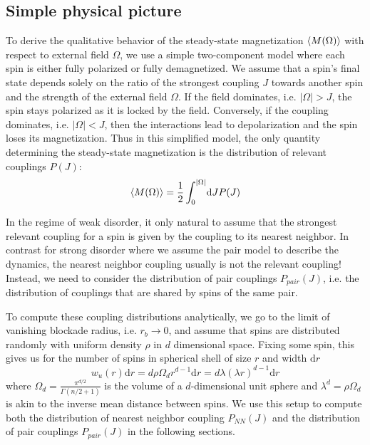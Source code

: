 \subsection{Simple physical picture}\label{sec:cusp-round-sharp}
To derive the qualitative behavior of the steady-state magnetization $\braket{M(\Omega)}$ with respect to external field $\Omega$, we use a simple two-component model where each spin is either fully polarized or fully demagnetized. We assume that a spin's final state depends solely on the ratio of the strongest coupling $J$ towards another spin and the strength of the external field $\Omega$. If the field dominates, i.e. $|\Omega| > J$, the spin stays polarized as it is locked by the field. Conversely, if the coupling dominates, i.e. $|\Omega| < J$, then the interactions lead to depolarization and the spin loses its magnetization. Thus in this simplified model, the only quantity determining the steady-state magnetization is the distribution of relevant couplings $P(J)$:
\begin{equation}\label{eq:Cusp-simple-model-magnetization}
	\braket{M(\Omega)} = \frac{1}{2}\int_0^{|\Omega|}\!\mathrm{d}J P(J)
\end{equation}

In the regime of weak disorder, it only natural to assume that the strongest relevant coupling for a spin is given by the coupling to its nearest neighbor. In contrast for strong disorder where we assume the pair model to describe the dynamics, the nearest neighbor coupling usually is not the relevant coupling! Instead, we need to consider the distribution of pair couplings $P_{pair}(J)$, i.e. the distribution of couplings that are shared by spins of the same pair.

To compute these coupling distributions analytically, we go to the limit of vanishing blockade radius, i.e. $r_b\rightarrow 0$, and assume that spins are distributed randomly with uniform density $\rho$ in $d$ dimensional space. Fixing some spin, this gives us for the number of spins in spherical shell of size $r$ and width $\mathrm{d}r$
\begin{equation}\label{eq:uniform-spin-distribution}
	w_u(r)\mathrm{d}r = d \rho \Omega_d r^{d-1}\mathrm{d}r = d\lambda (\lambda r)^{d-1}\mathrm{d}r
\end{equation}
where $\Omega_d = \frac{\pi^{d/2}}{\Gamma(n/2+1)}$ is the volume of a $d$-dimensional unit sphere and $\lambda^d = \rho \Omega_d$ is akin to the inverse mean distance between spins. We use this setup to compute both the distribution of nearest neighbor coupling $P_{NN}(J)$ and the distribution of pair couplings $P_{pair}(J)$ in the following sections.

